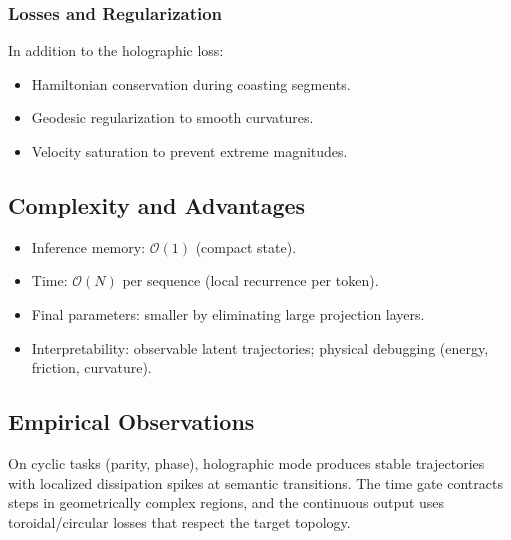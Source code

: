 \documentclass{article}
\numberwithin{equation}{section}
\begin{document}
\subsubsection{Losses and Regularization}
In addition to the holographic loss:
\begin{itemize}
\item Hamiltonian conservation during coasting segments.
\item Geodesic regularization to smooth curvatures.
\item Velocity saturation to prevent extreme magnitudes.
\end{itemize}

\subsection{Complexity and Advantages}
\begin{itemize}
\item Inference memory: $\mathcal{O}(1)$ (compact state).
\item Time: $\mathcal{O}(N)$ per sequence (local recurrence per token).
\item Final parameters: smaller by eliminating large projection layers.
\item Interpretability: observable latent trajectories; physical debugging (energy, friction, curvature).
\end{itemize}

\subsection{Empirical Observations}
On cyclic tasks (parity, phase), holographic mode produces stable trajectories with localized dissipation spikes at semantic transitions. The time gate contracts steps in geometrically complex regions, and the continuous output uses toroidal/circular losses that respect the target topology.
\end{document}
